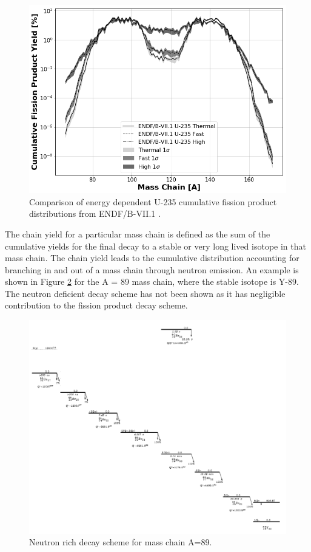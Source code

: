 \begin{figure}[h!]
	\includegraphics[width=\linewidth]{Figures/Chapter2/ENDF_FPs.png}
	\caption[Comparison of energy dependent U-235 cumulative fission product distributions]{Comparison of energy dependent U-235 cumulative fission product distributions from ENDF/B-VII.1 \cite{ENDF}.}
	\label{fig:U235Cumulative}	
\end{figure}

The chain yield for a particular mass chain is defined as the sum of the cumulative yields for the final decay to a stable or very long lived isotope in that mass chain\cite{Nichols2008}. The chain yield leads to the cumulative distribution accounting for branching in and out of a mass chain through neutron emission. 
An example is shown in Figure \ref{fig:89} for the A = 89 mass chain, where the stable isotope is Y-89\cite{SINGH20131}. 
The neutron deficient decay scheme has not been shown as it has negligible contribution to the fission product decay scheme. 

\begin{figure}[h!]
	\includegraphics[width=\linewidth]{Figures/Chapter2/89MassChain.png}
	\caption[Neutron rich decay scheme for mass chain A=89.]{Neutron rich decay scheme for mass chain A=89\cite{SINGH20131}.}
	\label{fig:89}	
\end{figure}

